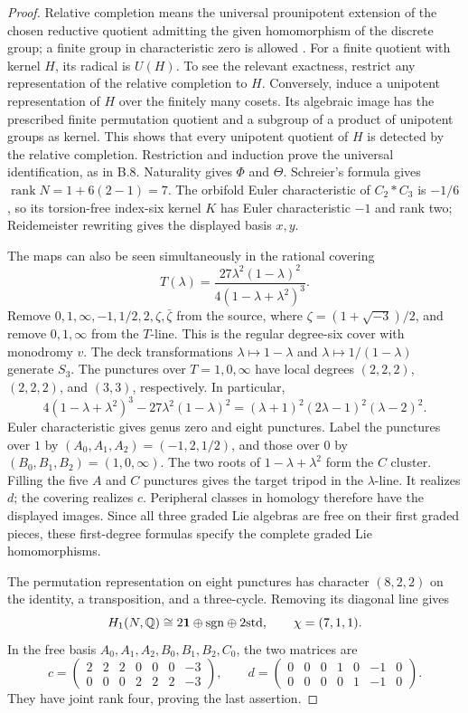 \begin{proof}
Relative completion means the universal prounipotent extension of the
chosen reductive quotient admitting the given homomorphism of the
discrete group; a finite group in characteristic zero is allowed
\citep[\S1, pp.~47--48]{Hain1998Relative}. For a finite quotient with
kernel $H$, its radical is $U(H)$. To see the relevant exactness,
restrict any representation of the relative completion to $H$.
Conversely, induce a unipotent representation of $H$ over the finitely
many cosets. Its algebraic image has the prescribed finite permutation
quotient and a subgroup of a product of unipotent groups as kernel.
This shows that every unipotent quotient of $H$ is detected by the
relative completion. Restriction and induction prove the universal
identification, as in B.8. Naturality gives $\Phi$ and $\Theta$.
Schreier's formula gives $\operatorname{rank}N=1+6(2-1)=7$.
The orbifold Euler characteristic of $C_2*C_3$ is $-1/6$, so its
torsion-free index-six kernel $K$ has Euler characteristic $-1$ and
rank two; Reidemeister rewriting gives the displayed basis $x,y$.

The maps can also be seen simultaneously in the rational covering
\[
 T(\lambda)=
 \frac{27\lambda^2(1-\lambda)^2}{4(1-\lambda+\lambda^2)^3}.
\]
Remove $0,1,\infty,-1,1/2,2,\zeta,\bar\zeta$ from the source,
where $\zeta=(1+\sqrt{-3})/2$, and remove $0,1,\infty$ from the
$T$-line. This is the regular degree-six cover with monodromy $v$.
The deck transformations $\lambda\mapsto1-\lambda$ and
$\lambda\mapsto1/(1-\lambda)$ generate $S_3$.
The punctures over $T=1,0,\infty$ have local degrees
$(2,2,2)$, $(2,2,2)$, and $(3,3)$, respectively. In particular,
\[
 4(1-\lambda+\lambda^2)^3-27\lambda^2(1-\lambda)^2
  =(\lambda+1)^2(2\lambda-1)^2(\lambda-2)^2.
\]
Euler characteristic gives genus zero and eight punctures.
Label the punctures over $1$ by
$(A_0,A_1,A_2)=(-1,2,1/2)$, and those over $0$ by
$(B_0,B_1,B_2)=(1,0,\infty)$. The two roots of
$1-\lambda+\lambda^2$ form the $C$ cluster. Filling the five
$A$ and $C$ punctures gives the target tripod in the $\lambda$-line.
It realizes $d$; the covering realizes $c$. Peripheral classes in
homology therefore have the displayed images. Since all three graded
Lie algebras are free on their first graded pieces, these first-degree
formulas specify the complete graded Lie homomorphisms.

The permutation representation on eight punctures has character
$(8,2,2)$ on the identity, a transposition, and a three-cycle.
Removing its diagonal line gives
\[
 H_1(N,\mathbb Q)\cong2\mathbf1\oplus\mathrm{sgn}\oplus2\mathrm{std},
 \qquad\chi=(7,1,1).
\]
In the free basis $A_0,A_1,A_2,B_0,B_1,B_2,C_0$, the two matrices are
\[
 c=\begin{pmatrix}2&2&2&0&0&0&-3\\0&0&0&2&2&2&-3\end{pmatrix},
 \qquad
 d=\begin{pmatrix}0&0&0&1&0&-1&0\\0&0&0&0&1&-1&0\end{pmatrix}.
\]
They have joint rank four, proving the last assertion.
\end{proof}

